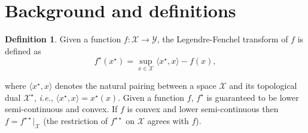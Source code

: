 \documentclass[conference]{IEEEtran}
\theoremstyle{plain}
\theoremstyle{definition}
\newtheorem{definition}{Definition}
\theoremstyle{remark}
\newcommand{\X}{\mathcal{X}}
\begin{document}
\section{Background and definitions}
\begin{definition}
Given a function $f:\mathcal{X}\to\mathcal{Y}$, 
	the Legendre-Fenchel transform of $f$ is defined as
	\begin{equation}
    f^\star(x^\star) = \sup_{x\in\X} \langle x^\star , x\rangle - f(x),
\end{equation}
\end{definition}
where $\langle  x^\star,x \rangle$ denotes the natural pairing between a space $\X$ and its topological dual $\X^\star$, \textit{i.e.},  $\langle x^\star,x \rangle= x^\star(x).$
Given a function $f$, $f^\star$ is guaranteed to be lower semi-continuous and convex. If $f$ is convex and lower semi-continuous then $f=f^{\star\star}|_{\X}$ (the restriction of $f^{\star\star}$ on $\X$ agrees with $f$).
\end{document}
